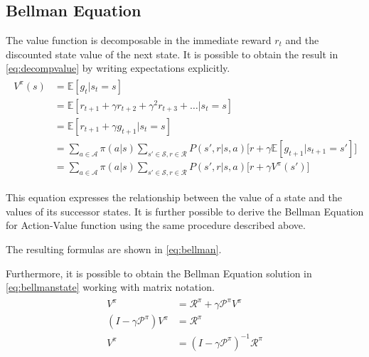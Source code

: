 \appendix

\chapter{}
\section{Bellman Equation} \label{appendix:bellmaneq}


The value function is decomposable in the immediate reward $r_t$ and the discounted state value of the next state. It is possible to obtain the result in \vref{eq:decompvalue} by writing expectations explicitly.
\begin{align}\label{eq:decompvalue}
\begin{split}
V^\pi(s) &= \mathbb{E}[g_t | s_t = s] \\
&= \mathbb{E}[r_{t+1} + \gamma r_{t+2} + \gamma^2 r_{t+3} + \dots | s_t = s] \\
&= \mathbb{E}[r_{t+1} + \gamma g_{t+1} | s_t = s] \\
&= \sum_{a \in \mathcal{A}}\pi(a|s)\sum_{s' \in \mathcal{S}, r \in \mathcal{R}}P(s', r | s, a)\big[r + \gamma\mathbb{E}[g_{t+1}| s_{t+1} = s']\big]\\
&= \sum_{a \in \mathcal{A}}\pi(a|s)\sum_{s' \in \mathcal{S}, r \in \mathcal{R}}P(s', r | s, a)\big[r + \gamma V^\pi(s')\big]
\end{split}
\end{align}

This equation expresses the relationship between the value of a state and the values of its successor states. It is further possible to derive the Bellman Equation for Action-Value function using the same procedure described above.

The resulting formulas are shown in \vref{eq:bellman}.

Furthermore, it is possible to obtain the Bellman Equation solution in \vref{eq:bellmanstate} working with matrix notation.
\begin{align} \label{eq:bellmanstate}
\begin{split}
V^\pi &= \mathcal{R}^\pi + \gamma \mathcal{P}^\pi V^\pi \\
(I - \gamma\mathcal{P}^\pi)V^\pi &= \mathcal{R}^\pi \\
V^\pi &= (I - \gamma\mathcal{P}^\pi)^{-1}\mathcal{R}^\pi
\end{split}
\end{align}

